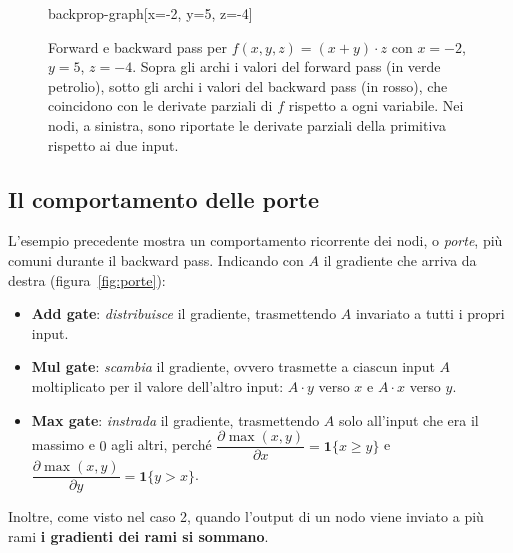 \begin{figure}[htbp]
\centering
\begin{widget}{backprop-graph}[x=-2, y=5, z=-4]
\end{widget}
\caption{Forward e backward pass per $f(x,y,z) = (x+y)\cdot z$ con $x=-2$, $y=5$, $z=-4$. Sopra gli archi i valori del forward pass (in verde petrolio), sotto gli archi i valori del backward pass (in rosso), che coincidono con le derivate parziali di $f$ rispetto a ogni variabile. Nei nodi, a sinistra, sono riportate le derivate parziali della primitiva rispetto ai due input.}
\label{fig:esempio-qz}
\end{figure}

\subsection{Il comportamento delle porte}
L'esempio precedente mostra un comportamento ricorrente dei nodi, o \emph{porte}, più comuni durante il backward pass. Indicando con $A$ il gradiente che arriva da destra (figura~\ref{fig:porte}):
\begin{itemize}
    \item \textbf{Add gate}: \emph{distribuisce} il gradiente, trasmettendo $A$ invariato a tutti i propri input.
    \item \textbf{Mul gate}: \emph{scambia} il gradiente, ovvero trasmette a ciascun input $A$ moltiplicato per il valore dell'altro input: $A\cdot y$ verso $x$ e $A\cdot x$ verso $y$.
    \item \textbf{Max gate}: \emph{instrada} il gradiente, trasmettendo $A$ solo all'input che era il massimo e $0$ agli altri, perché $\dfrac{\partial \max(x,y)}{\partial x} = \mathbf{1}\{x \geq y\}$ e $\dfrac{\partial \max(x,y)}{\partial y} = \mathbf{1}\{y > x\}$.
\end{itemize}
Inoltre, come visto nel caso 2, quando l'output di un nodo viene inviato a più rami \textbf{i gradienti dei rami si sommano}.

